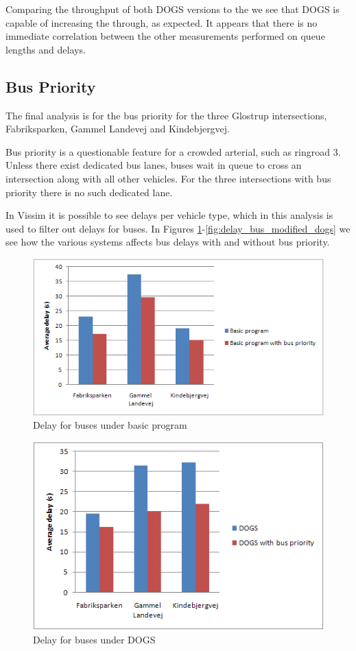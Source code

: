 Comparing the throughput of both DOGS versions to the we see that DOGS is capable of increasing the through, as expected. It appears that there is no immediate correlation between the other measurements performed on queue lengths and delays.

\subsection{Bus Priority}
The final analysis is for the bus priority for the three Glostrup intersections, Fabriksparken, Gammel Landevej and Kindebjergvej.

Bus priority is a questionable feature for a crowded arterial, such as ringroad 3. Unless there exist dedicated bus lanes, buses wait in queue to cross an intersection along with all other vehicles. For the three intersections with bus priority there is no such dedicated lane.

In Vissim it is possible to see delays per vehicle type, which in this analysis is used to filter out delays for buses.
In Figures \ref{fig:delay_bus_basic}-\ref{fig:delay_bus_modified_dogs} we see how the various systems affects bus delays with and without bus priority.

\begin{figure}[ht]
\centering
\includegraphics[scale=0.30]{delay_bus_basic.png}
\caption{Delay for buses under basic program}
\label{fig:delay_bus_basic}
\end{figure}

\begin{figure}[ht]
\centering
\includegraphics[scale=0.30]{delay_bus_dogs.png}
\caption{Delay for buses under DOGS}
\label{fig:delay_bus_dogs}
\end{figure}

